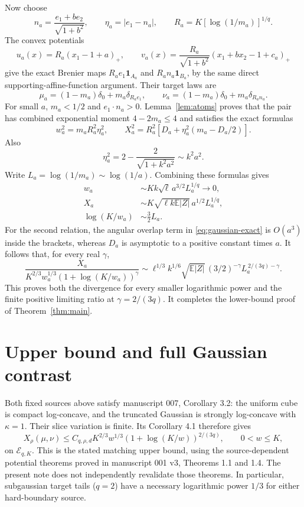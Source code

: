 \documentclass[11pt]{article}
\theoremstyle{remark}\newtheorem{remark}[theorem]{Remark}
\newcommand{\E}{\mathbb E}
\newcommand{\ind}{\mathbf 1}
\begin{document}
Now choose
\[
 n_a=\frac{e_1+b e_2}{\sqrt{1+b^2}},\qquad
 \eta_a=|e_1-n_a|,\qquad
 R_a=K[\log(1/m_a)]^{1/q}.
\]
The convex potentials
\[
 u_a(x)=R_a(x_1-1+a)_+,\qquad
 v_a(x)=\frac{R_a}{\sqrt{1+b^2}}(x_1+b x_2-1+c_a)_+
\]
give the exact Brenier maps $R_a e_1\ind_{A_a}$ and
$R_a n_a\ind_{B_a}$, by the same direct supporting-affine-function
argument. Their target laws are
\[
 \mu_a=(1-m_a)\delta_0+m_a\delta_{R_ae_1},\qquad
 \nu_a=(1-m_a)\delta_0+m_a\delta_{R_an_a}.
\]
For small $a$, $m_a<1/2$ and $e_1\cdot n_a>0$. Lemma~\ref{lem:atoms}
proves that the pair has combined exponential moment $4-2m_a\le4$
and satisfies the exact formulas
\begin{equation}\label{eq:gaussian-exact}
 w_a^2=m_aR_a^2\eta_a^2,\qquad
 X_a^2=R_a^2[D_a+\eta_a^2(m_a-D_a/2)].
\end{equation}
Also
\[
 \eta_a^2=2-\frac2{\sqrt{1+k^2a^2}}\sim k^2a^2.
\]
Write $L_a=\log(1/m_a)\sim\log(1/a)$. Combining these formulas gives
\begin{align*}
 w_a&\sim Kk\sqrt\ell\,a^{3/2}L_a^{1/q}\longrightarrow0,\\
 X_a&\sim K\sqrt{\ell k\E|Z|}\,a^{1/2}L_a^{1/q},\\
 \log(K/w_a)&\sim\frac32 L_a.
\end{align*}
For the second relation, the angular overlap term in
\eqref{eq:gaussian-exact} is $O(a^3)$ inside the brackets, whereas
$D_a$ is asymptotic to a positive constant times $a$.
It follows that, for every real $\gamma$,
\begin{equation}\label{eq:gaussian-ratio}
 \frac{X_a}{K^{2/3}w_a^{1/3}(1+\log(K/w_a))^\gamma}
 \sim\ell^{1/3}k^{1/6}\sqrt{\E|Z|}\,(3/2)^{-\gamma}
                  L_a^{\,2/(3q)-\gamma}.
\end{equation}
This proves both the divergence for every smaller logarithmic power
and the finite positive limiting ratio at $\gamma=2/(3q)$. It
completes the lower-bound proof of Theorem~\ref{thm:main}.

\section{Upper bound and full Gaussian contrast}
Both fixed sources above satisfy manuscript 007, Corollary 3.2:
the uniform cube is compact log-concave, and the truncated Gaussian
is strongly log-concave with $\kappa=1$. Their slice variation is
finite. Its Corollary 4.1 therefore gives
\[
 X_\rho(\mu,\nu)
 \le C_{q,\rho,d}K^{2/3}w^{1/3}
           (1+\log(K/w))^{2/(3q)},\qquad 0<w\le K,
\]
on $\mathcal E_{q,K}$. This is the stated matching upper bound,
using the source-dependent potential theorems proved in manuscript
001 v3, Theorems 1.1 and 1.4. The present note does not independently
revalidate those theorems. In particular, subgaussian target tails ($q=2$)
have a necessary logarithmic power $1/3$ for either hard-boundary
source.
\end{document}
